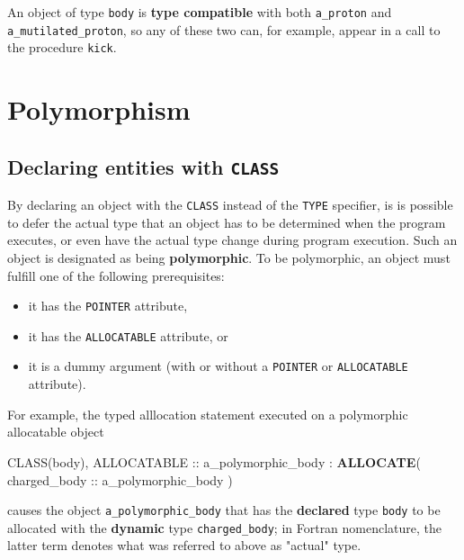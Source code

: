 \documentclass[]{scrartcl}
\newenvironment{Shaded}{}{}
\newcommand{\DataTypeTok}[1]{\textcolor[rgb]{0.56,0.13,0.00}{#1}}
\newcommand{\KeywordTok}[1]{\textcolor[rgb]{0.00,0.44,0.13}{\textbf{#1}}}
\newcommand{\NormalTok}[1]{#1}
\providecommand{\tightlist}{%
  \setlength{\itemsep}{0pt}\setlength{\parskip}{0pt}}
\begin{document}
An object of type \texttt{body} is \textbf{type compatible} with both
\texttt{a\_proton} and \texttt{a\_mutilated\_proton}, so any of these
two can, for example, appear in a call to the procedure \texttt{kick}.

\section{Polymorphism}\label{polymorphism}

\subsection{\texorpdfstring{Declaring entities with
\texttt{CLASS}}{Declaring entities with CLASS}}\label{declaring-entities-with-class}

By declaring an object with the \texttt{CLASS} instead of the
\texttt{TYPE} specifier, is is possible to defer the actual type that an
object has to be determined when the program executes, or even have the
actual type change during program execution. Such an object is
designated as being \textbf{polymorphic}. To be polymorphic, an object
must fulfill one of the following prerequisites:

\begin{itemize}
\tightlist
\item
  it has the \texttt{POINTER} attribute,
\item
  it has the \texttt{ALLOCATABLE} attribute, or
\item
  it is a dummy argument (with or without a \texttt{POINTER} or
  \texttt{ALLOCATABLE} attribute).
\end{itemize}

For example, the typed alllocation statement executed on a polymorphic
allocatable object

\begin{Shaded}
\begin{Highlighting}[]
\DataTypeTok{CLASS(body)}\NormalTok{, }\DataTypeTok{ALLOCATABLE} \DataTypeTok{::}\NormalTok{ a\_polymorphic\_body}
\NormalTok{:}
\KeywordTok{ALLOCATE}\NormalTok{( charged\_body }\DataTypeTok{::}\NormalTok{ a\_polymorphic\_body )}
\end{Highlighting}
\end{Shaded}

causes the object \texttt{a\_polymorphic\_body} that has the
\textbf{declared} type \texttt{body} to be allocated with the
\textbf{dynamic} type \texttt{charged\_body}; in Fortran nomenclature,
the latter term denotes what was referred to above as "actual" type.
\end{document}
